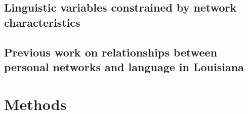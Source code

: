     \subsection{Linguistic variables constrained by network characteristics}
    \subsection{Previous work on relationships between personal networks and language in Louisiana}
  \section{Methods}
